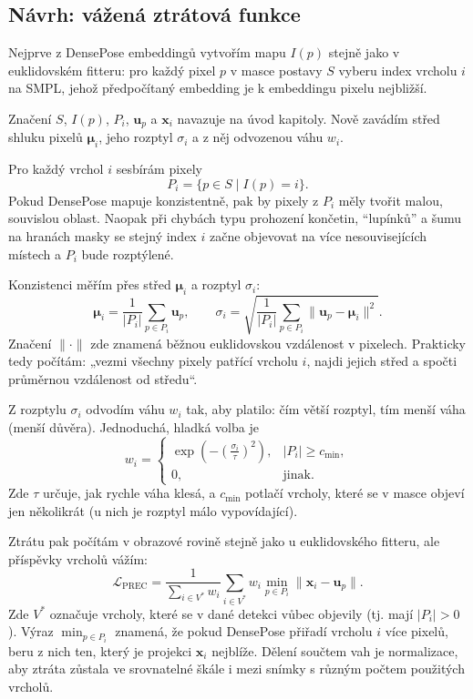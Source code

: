 \documentclass[11pt,a4paper,twoside,openright]{report}
\begin{document}
\subsection{Návrh: vážená ztrátová funkce}

Nejprve z DensePose embeddingů vytvořím mapu $I(p)$ stejně jako v euklidovském fitteru: pro každý pixel $p$ v masce postavy $S$ vyberu index vrcholu $i$ na SMPL, jehož předpočítaný embedding je k embeddingu pixelu nejbližší.

Značení $S$, $I(p)$, $P_i$, $\mathbf{u}_p$ a $\mathbf{x}_i$ navazuje na úvod kapitoly. Nově zavádím střed shluku pixelů $\boldsymbol{\mu}_i$, jeho rozptyl $\sigma_i$ a z něj odvozenou váhu $w_i$.

Pro každý vrchol $i$ sesbírám pixely
\[
P_i = \{p \in S\;|\; I(p)=i\}.
\]
Pokud DensePose mapuje konzistentně, pak by pixely z $P_i$ měly tvořit malou, souvislou oblast. Naopak při chybách typu prohození končetin, \enquote{lupínků} a šumu na hranách masky se stejný index $i$ začne objevovat na více nesouvisejících místech a $P_i$ bude rozptýlené.

Konzistenci měřím přes střed $\boldsymbol{\mu}_i$ a rozptyl $\sigma_i$:
\[
\boldsymbol{\mu}_i = \frac{1}{|P_i|}\sum_{p\in P_i} \mathbf{u}_p,
\qquad
\sigma_i = \sqrt{\frac{1}{|P_i|}\sum_{p\in P_i}\lVert \mathbf{u}_p - \boldsymbol{\mu}_i \rVert^2}.
\]
Značení $\lVert \cdot \rVert$ zde znamená běžnou euklidovskou vzdálenost v pixelech. Prakticky tedy počítám: „vezmi všechny pixely patřící vrcholu $i$, najdi jejich střed a spočti průměrnou vzdálenost od středu“.

Z rozptylu $\sigma_i$ odvodím váhu $w_i$ tak, aby platilo: čím větší rozptyl, tím menší váha (menší důvěra). Jednoduchá, hladká volba je
\[
w_i = \begin{cases}
\exp\!\left(-\left(\frac{\sigma_i}{\tau}\right)^2\right), & |P_i|\ge c_{\min},\\
0, & \text{jinak}.
\end{cases}
\]
Zde $\tau$ určuje, jak rychle váha klesá, a $c_{\min}$ potlačí vrcholy, které se v masce objeví jen několikrát (u nich je rozptyl málo vypovídající).

Ztrátu pak počítám v obrazové rovině stejně jako u euklidovského fitteru, ale příspěvky vrcholů vážím:
\[
\mathcal{L}_{\text{PREC}} = \frac{1}{\sum_{i\in V^{*}} w_i}\sum_{i\in V^{*}} w_i \min_{p\in P_i} \lVert \mathbf{x}_i - \mathbf{u}_p \rVert.
\]
Zde $V^{*}$ označuje vrcholy, které se v dané detekci vůbec objevily (tj. mají $|P_i|>0$). Výraz $\min_{p\in P_i}$ znamená, že pokud DensePose přiřadí vrcholu $i$ více pixelů, beru z nich ten, který je projekci $\mathbf{x}_i$ nejblíže. Dělení součtem vah je normalizace, aby ztráta zůstala ve srovnatelné škále i mezi snímky s různým počtem použitých vrcholů.
\end{document}
